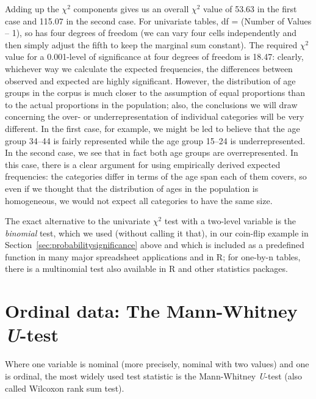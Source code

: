 Adding up the $\chi^2$  components gives us an overall $\chi^2$ value of 53.63 in the first case and 115.07 in the second case. For univariate tables, df = (Number of Values -- 1), so  has four degrees of freedom (we can vary four cells independently and then simply adjust the fifth to keep the marginal sum constant). The required $\chi^2$  value for a 0.001\hyp{}level of significance  at four degrees of freedom is 18.47: clearly, whichever way we calculate the expected  frequencies, the differences between observed and expected are highly significant. However, the distribution  of age  groups in the corpus is much closer to the assumption of equal proportions than to the actual proportions in the population; also, the conclusions we will draw concerning the over- or underrepresentation  of individual categories  will be very different. In the first case, for example, we might be led to believe that the age  group 34--44 is fairly represented while the age  group 15--24 is underrepresented. In the second case, we see that in fact both age  groups are overrepresented. In this case, there is a clear argument for using empirically derived expected  frequencies: the categories  differ in terms of the age  span each of them covers, so even if we thought that the distribution of ages in the population is homogeneous, we would not expect all categories to have the same size.

The exact alternative to the univariate $\chi^2$  test with a two\hyp{}level variable is the \textit{binomial}  test, which we used (without calling it that), in our coin\hyp{}flip example in Section~\ref{sec:probabilitysignificance} above and which is included as a predefined function in many major spreadsheet applications and in R; for one\hyp{}by\hyp{}n tables, there is a multinomial test also available in R and other statistics packages.

\section{Ordinal data: The Mann\hyp{}Whitney \textit{U}\hyp{}test}\label{sec:mannwhitneytest}\largerpage

Where one variable is nominal  (more precisely, nominal with two values) and one is ordinal,  the most widely used test statistic is the Mann\hyp{}Whitney  \textit{U}-test (also called Wilcoxon rank sum test).

